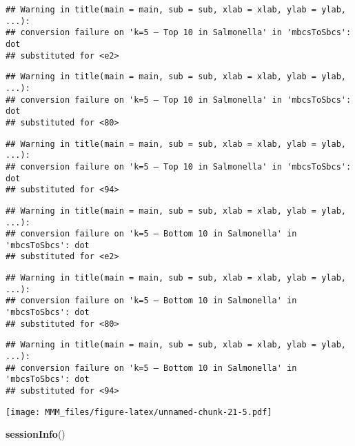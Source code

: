 \documentclass[
]{article}
\newenvironment{Shaded}{\begin{snugshade}}{\end{snugshade}}
\newcommand{\FunctionTok}[1]{\textcolor[rgb]{0.13,0.29,0.53}{\textbf{#1}}}
\newcommand{\NormalTok}[1]{#1}
\begin{document}
\begin{verbatim}
## Warning in title(main = main, sub = sub, xlab = xlab, ylab = ylab, ...):
## conversion failure on 'k=5 — Top 10 in Salmonella' in 'mbcsToSbcs': dot
## substituted for <e2>
\end{verbatim}

\begin{verbatim}
## Warning in title(main = main, sub = sub, xlab = xlab, ylab = ylab, ...):
## conversion failure on 'k=5 — Top 10 in Salmonella' in 'mbcsToSbcs': dot
## substituted for <80>
\end{verbatim}

\begin{verbatim}
## Warning in title(main = main, sub = sub, xlab = xlab, ylab = ylab, ...):
## conversion failure on 'k=5 — Top 10 in Salmonella' in 'mbcsToSbcs': dot
## substituted for <94>
\end{verbatim}

\begin{verbatim}
## Warning in title(main = main, sub = sub, xlab = xlab, ylab = ylab, ...):
## conversion failure on 'k=5 — Bottom 10 in Salmonella' in 'mbcsToSbcs': dot
## substituted for <e2>
\end{verbatim}

\begin{verbatim}
## Warning in title(main = main, sub = sub, xlab = xlab, ylab = ylab, ...):
## conversion failure on 'k=5 — Bottom 10 in Salmonella' in 'mbcsToSbcs': dot
## substituted for <80>
\end{verbatim}

\begin{verbatim}
## Warning in title(main = main, sub = sub, xlab = xlab, ylab = ylab, ...):
## conversion failure on 'k=5 — Bottom 10 in Salmonella' in 'mbcsToSbcs': dot
## substituted for <94>
\end{verbatim}

\texttt{[image: MMM\_files/figure-latex/unnamed-chunk-21-5.pdf]}

\begin{Shaded}
\begin{Highlighting}[]
\FunctionTok{sessionInfo}\NormalTok{()}
\end{Highlighting}
\end{Shaded}
\end{document}
